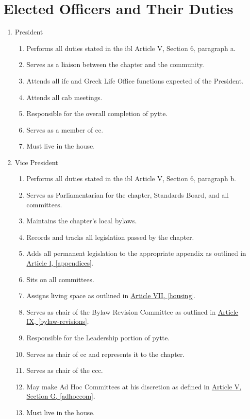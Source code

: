 \section{Elected Officers and Their Duties}
	\begin{enumerate}
		\item President
			\begin{enumerate}
				\item Performs all duties stated in the \gls{ibl} Article V, Section 6, paragraph a.
				\item Serves as a liaison between the chapter and the community.
				\item Attends all \gls{ifc} and Greek Life Office functions expected of the President.
				\item Attends all \gls{cab} meetings.
				\item Responsible for the overall completion of \gls{pytte}.
				\item Serves as a member of \gls{ec}.
				\item Must live in the house.
			\end{enumerate}
		
		\item Vice President
			\begin{enumerate}
				\item Performs all duties stated in the \gls{ibl} Article V, Section 6, paragraph b.
				\item Serves as Parliamentarian for the chapter, Standards Board, and all committees.
				\item Maintains the chapter's local bylaws. %
                \item Records and tracks all legislation passed by the chapter.
				\item Adds all permanent legislation to the appropriate appendix as outlined in \hyperref[appendices]{Article I, \autoref*{appendices}}.
				\item Sits on all committees.
				\item Assigns living space as outlined in \hyperref[housing]{Article VII, \autoref*{housing}}.
				\item Serves as chair of the Bylaw Revision Committee as outlined in \hyperref[bylaw-revisions]{Article IX, \autoref*{bylaw-revisions}}.
				\item Responsible for the Leadership portion of \gls{pytte}.
				\item Serves as chair of \gls{ec} and represents it to the chapter.
				\item Serves as chair of the \gls{ccc}.
				\item May make Ad Hoc Committees at his discretion as defined in \hyperref[adhoccom]{Article V, Section G, \autoref*{adhoccom}}.
				\item Must live in the house.
			\end{enumerate}


\end{enumerate}

